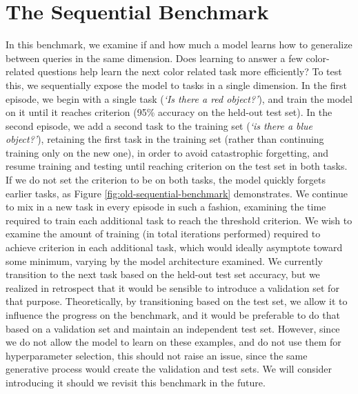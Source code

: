 \section{The Sequential Benchmark}
In this benchmark, we examine if and how much a model learns how to generalize between queries in the same dimension. Does learning to answer a few color-related questions help learn the next color related task more efficiently? To test this, we sequentially expose the model to tasks in a single dimension. In the first episode, we begin with a single task (\textit{`Is there a red object?'}), and train the model on it until it reaches criterion (95\% accuracy on the held-out test set). In the second episode, we add a second task to the training set (\textit{`is there a blue object?'}), retaining the first task in the training set (rather than continuing training only on the new one), in order to avoid catastrophic forgetting, and resume training and testing until reaching criterion on the test set in both tasks. If we do not set the criterion to be on both tasks, the model quickly forgets earlier tasks, as Figure \ref{fig:old-sequential-benchmark} demonstrates. We continue to mix in a new task in every episode in such a fashion, examining the time required to train each additional task to reach the threshold criterion. We wish to examine the amount of training (in total iterations performed) required to achieve criterion in each additional task, which would ideally asymptote toward some minimum, varying by the model architecture examined. We currently transition to the next task based on the held-out test set accuracy, but we realized in retrospect that it would be sensible to introduce a validation set for that purpose. Theoretically, by transitioning based on the test set, we allow it to influence the progress on the benchmark, and it would be preferable to do that based on a validation set and maintain an independent test set. However, since we do not allow the model to learn on these examples, and do not use them for hyperparameter selection, this should not raise an issue, since the same generative process would create the validation and test sets. We will consider introducing it should we revisit this benchmark in the future.  

